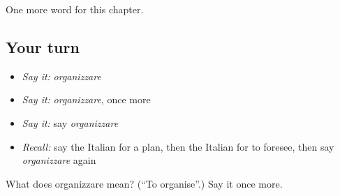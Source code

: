 \begin{grammarlens}[title={What you've built}]
One more word for this chapter.
\end{grammarlens}

\subsection*{Your turn}
\begin{itemize}
\raggedright
  \item \emph{Say it:} \emph{organizzare}
  \item \emph{Say it:} \emph{organizzare}, once more
  \item \emph{Say it:} say \emph{organizzare}
  \item \emph{Recall:} say the Italian for a plan, then the Italian for to foresee, then say \emph{organizzare} again
\end{itemize}

\begin{tcolorbox}[breakable,colback=teal!4,colframe=teal!35!black,title={Before you move on}]
What does organizzare mean? (\textquotedblleft{}To organise\textquotedblright{}.) Say it once more.
\end{tcolorbox}
